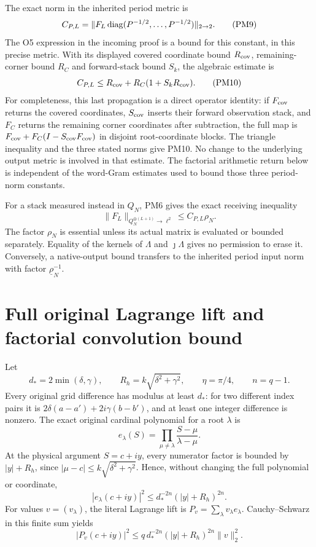 The exact norm in the inherited period metric is
\[
 C_{P,L}=\|F_L\operatorname{diag}(P^{-1/2},\ldots,P^{-1/2})\|_{2\to2}.       \tag{PM9}
\]
The O5 expression in the incoming proof is a bound for this
constant, in this precise metric.  With its displayed covered
coordinate bound $R_{\rm cov}$, remaining-corner bound $R_C$
and forward-stack bound $S_k$, the algebraic estimate is
\[
 C_{P,L}\le R_{\rm cov}+R_C(1+S_kR_{\rm cov}).                  \tag{PM10}
\]
For completeness, this last propagation is a direct operator
identity: if $F_{\rm cov}$ returns the covered coordinates,
$S_{\rm cov}$ inserts their forward observation stack, and
$F_C$ returns the remaining corner coordinates after subtraction,
the full map is
$F_{\rm cov}+F_C(I-S_{\rm cov}F_{\rm cov})$ in disjoint
root-coordinate blocks.  The triangle inequality and the three
stated norms give PM10.  No change to the underlying output
metric is involved in that estimate.  The factorial arithmetic
return below is independent of the word-Gram estimates used to
bound those three period-norm constants.

For a stack measured instead in $Q_N$, PM6 gives the exact
receiving inequality
\[
 \boxed{\|F_L\|_{Q_N^{\oplus(L+1)}\to\ell^2}
                      \le C_{P,L}\rho_N.}                     \tag{PM11}
\]
The factor $\rho_N$ is essential unless its actual matrix is
evaluated or bounded separately.  Equality of the kernels of
$\Lambda$ and $\jmath\Lambda$ gives no permission to erase it.
Conversely, a native-output bound transfers to the inherited
period input norm with factor $\underline\rho_N^{-1}$.

\section{Full original Lagrange lift and factorial convolution bound}
Let
\[
 d_*=2\min(\delta,\gamma),\qquad
 R_h=k\sqrt{\delta^2+\gamma^2},\qquad
 \eta=\pi/4,\qquad n=q-1.                                     \tag{PM12}
\]
Every original grid difference has modulus at least $d_*$:
for two different index pairs it is
$2\delta(a-a')+2i\gamma(b-b')$, and at least one integer
difference is nonzero.  The exact original cardinal polynomial
for a root $\lambda$ is
\[
 e_\lambda(S)=\prod_{\mu\ne\lambda}
                         \frac{S-\mu}{\lambda-\mu}.
\]
At the physical argument $S=c+iy$, every numerator factor is
bounded by $|y|+R_h$, since
$|\mu-c|\le k\sqrt{\delta^2+\gamma^2}$.  Hence, without changing
the full polynomial or coordinate,
\[
 |e_\lambda(c+iy)|^2
              \le d_*^{-2n}(|y|+R_h)^{2n}.                     \tag{PM13}
\]
For values $v=(v_\lambda)$, the literal Lagrange lift is
$P_v=\sum_\lambda v_\lambda e_\lambda$.  Cauchy--Schwarz in
this finite sum yields
\[
 |P_v(c+iy)|^2\le q\,d_*^{-2n}(|y|+R_h)^{2n}\|v\|_2^2.       \tag{PM14}
\]

